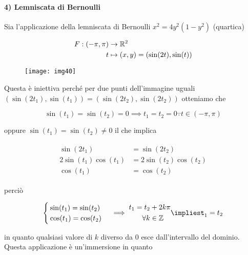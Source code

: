 \paragraph{4) Lemniscata di Bernoulli}

Sia l'applicazione della lemniscata di Bernoulli $ x^{2} = 4 y^{2} (1-y^{2}) $ (quartica)

\begin{align}
	\begin{split}
		F : (-\pi,\pi) &\to \mathbb{R}^{2}\\
		t &\mapsto (x,y) = (\sin(2t),\sin(t))
	\end{split}
\end{align}

\begin{figure}[H]
	\centering
	\texttt{[image: img40]}
\end{figure}

Questa è iniettiva perché per due punti dell'immagine uguali $ (\sin(2t_{1}),\sin(t_{1})) = (\sin(2t_{2}),\sin(2t_{2})) $ otteniamo che

\begin{equation}
	\sin(t_{1}) = \sin(t_{2}) = 0 \implies t_{1} = t_{2} = 0 \because t \in (-\pi,\pi)
\end{equation}

oppure $ \sin(t_{1}) = \sin(t_{2}) \neq 0 $ il che implica

\begin{align}
	\begin{split}
		\sin(2t_{1}) &= \sin(2t_{2})\\
		2 \sin(t_{1}) \cos(t_{1}) &= 2 \sin(t_{2}) \cos(t_{2})\\
		\cos(t_{1}) &= \cos(t_{2})
	\end{split}		
\end{align}

perciò

\begin{equation}
	\begin{cases}
		\sin(t_{1}) = \sin(t_{2})\\
		\cos(t_{1}) = \cos(t_{2})
	\end{cases}%
	\implies%
	\begin{aligned}
		t_{1} = t_{2} &+ 2 k \pi\\
		\forall k &\in \Z
	\end{aligned}
	\implies%
	t_{1} = t_{2}
\end{equation}

in quanto qualsiasi valore di $ k $ diverso da 0 esce dall'intervallo del dominio.\\
Questa applicazione è un'immersione in quanto

